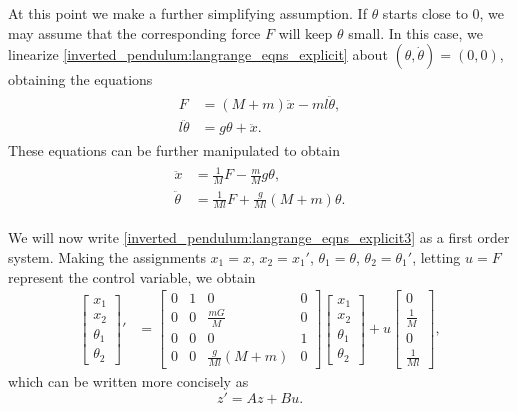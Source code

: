 At this point we make a further simplifying assumption. 
If $\theta$ starts close to $0$, we may assume that the corresponding force $F$ will keep $\theta$ small. 
In this case, we linearize \eqref{inverted_pendulum:langrange_eqns_explicit} about $(\theta, \dot{\theta}) = (0,0)$, obtaining the equations 
\begin{align*}
	\begin{split}
		F &= (M + m)\ddot{x} - ml\ddot{\theta},\\
		l \ddot{\theta} &= g \theta + \ddot{x}.
	\end{split}%
\end{align*}
These equations can be further manipulated 
to obtain 
\begin{align}
	\begin{split}
		\ddot{x} &= \frac{1}{M}F - \frac{m}{M}g\theta,\\
		\ddot{\theta} &= \frac{1}{Ml}F + \frac{g}{Ml} (M+m) \theta.
	\end{split}\label{inverted_pendulum:langrange_eqns_explicit3}
\end{align}

We will now write \eqref{inverted_pendulum:langrange_eqns_explicit3} as a first order system. 
Making the assignments $x_1 = x$, $x_2 = x_1'$, $\theta_1 = \theta$, $\theta_2 = \theta_1'$, letting $u = F$ represent the control variable, we obtain 
\begin{align*}
\begin{bmatrix}
x_1\\
x_2 \\
\theta_1 \\
\theta_2
\end{bmatrix}' &= 
\begin{bmatrix}
0 & 1 & 0 & 0\\
0 & 0 & \frac{mG}{M} & 0 \\
0 & 0 & 0 & 1 \\
0 & 0 & \frac{g}{Ml}(M+m) & 0
\end{bmatrix}
\begin{bmatrix}
x_1\\
x_2 \\
\theta_1 \\
\theta_2
\end{bmatrix} + u
\begin{bmatrix}
0\\
\frac{1}{M} \\
0 \\
\frac{1}{Ml}
\end{bmatrix},
\end{align*}
which can be written more concisely as 
\[z' = Az + Bu.\]


